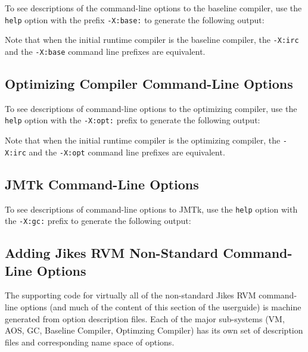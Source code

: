 To see descriptions of the command-line options to the baseline
compiler, use the {\tt help} option with the prefix {\tt -X:base:} 
to generate the following output:

\T \begin{small}

\T \end{small}
 
Note that when the initial runtime compiler is the baseline compiler, 
the {\tt -X:irc} and the {\tt -X:base} command line prefixes are equivalent.

\subsection{Optimizing Compiler Command-Line Options}
\label{section:nonadaptive:optimizing:options}

To see descriptions of command-line options to the optimizing compiler,
use the {\tt help} option with the {\tt -X:opt:} prefix 
to generate the following output:

\T \begin{tiny}

\T \end{tiny}

Note that when the initial runtime compiler is the optimizing compiler, 
the {\tt -X:irc} and the {\tt -X:opt} command line prefixes are equivalent.

\subsection{JMTk Command-Line Options}
\label{section:jmtkoptions}

To see descriptions of command-line options to JMTk,
use the {\tt help} option with the {\tt -X:gc:} prefix 
to generate the following output:

\T \begin{tiny}

\T \end{tiny}

\subsection{Adding Jikes RVM Non-Standard Command-Line Options}
The supporting code for virtually all of the non-standard
Jikes\TMweb{} RVM command-line options (and much of the content of
this section of the userguide) is machine generated from
option description files.  Each of the major sub-systems (VM, AOS, GC,
Baseline Compiler, Optimzing Compiler) has its own set of description
files and corresponding name space of options. 

